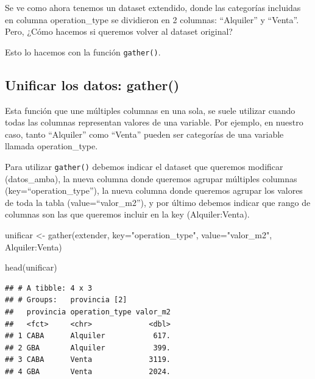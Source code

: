 \documentclass[
  spanish,
]{book}
\newenvironment{Shaded}{\begin{snugshade}}{\end{snugshade}}
\newcommand{\AttributeTok}[1]{\textcolor[rgb]{0.77,0.63,0.00}{#1}}
\newcommand{\FunctionTok}[1]{\textcolor[rgb]{0.00,0.00,0.00}{#1}}
\newcommand{\NormalTok}[1]{#1}
\newcommand{\OtherTok}[1]{\textcolor[rgb]{0.56,0.35,0.01}{#1}}
\newcommand{\SpecialCharTok}[1]{\textcolor[rgb]{0.00,0.00,0.00}{#1}}
\newcommand{\StringTok}[1]{\textcolor[rgb]{0.31,0.60,0.02}{#1}}
\begin{document}
Se ve como ahora tenemos un dataset extendido, donde las categorías incluidas en columna operation\_type se dividieron en 2 columnas: ``Alquiler'' y ``Venta''. Pero, ¿Cómo hacemos si queremos volver al dataset original?

Esto lo hacemos con la función \texttt{gather()}.

\hypertarget{unificar-los-datos-gather}{%
\subsection{Unificar los datos: gather()}\label{unificar-los-datos-gather}}

Esta función que une múltiples columnas en una sola, se suele utilizar cuando todas las columnas representan valores de una variable. Por ejemplo, en nuestro caso, tanto ``Alquiler'' como ``Venta'' pueden ser categorías de una variable llamada operation\_type.

Para utilizar \texttt{gather()} debemos indicar el dataset que queremos modificar (datos\_amba), la nueva columna donde queremos agrupar múltiples columnas (key=``operation\_type''), la nueva columna donde queremos agrupar los valores de toda la tabla (value=``valor\_m2''), y por último debemos indicar que rango de columnas son las que queremos incluir en la key (Alquiler:Venta).

\begin{Shaded}
\begin{Highlighting}[]
\NormalTok{unificar }\OtherTok{\textless{}{-}} \FunctionTok{gather}\NormalTok{(extender, }\AttributeTok{key=}\StringTok{"operation\_type"}\NormalTok{, }\AttributeTok{value=}\StringTok{"valor\_m2"}\NormalTok{, Alquiler}\SpecialCharTok{:}\NormalTok{Venta)}
\end{Highlighting}
\end{Shaded}

\begin{Shaded}
\begin{Highlighting}[]
\FunctionTok{head}\NormalTok{(unificar)}
\end{Highlighting}
\end{Shaded}

\begin{verbatim}
## # A tibble: 4 x 3
## # Groups:   provincia [2]
##   provincia operation_type valor_m2
##   <fct>     <chr>             <dbl>
## 1 CABA      Alquiler           617.
## 2 GBA       Alquiler           399.
## 3 CABA      Venta             3119.
## 4 GBA       Venta             2024.
\end{verbatim}
\end{document}
